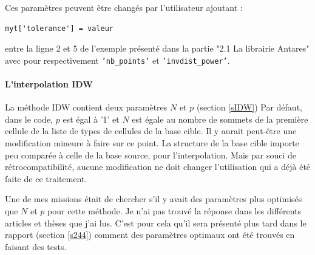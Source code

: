 Ces paramètres peuvent être changés par l'utilisateur ajoutant :
\begin{lstlisting}[]
    myt['tolerance'] = valeur
\end{lstlisting}
entre la ligne 2 et 5 de l'exemple présenté dans la partie "2.1 La librairie Antares" avec pour respectivement \texttt{'nb\_points'} et \texttt{'invdist\_power'}.\label{parametres}

\label{implementation_IDW}\paragraph{L'interpolation IDW}

La méthode IDW contient deux paramètres \(N\) et \(p\) (section \ref{sIDW})
Par défaut, dans le code, \(p\) est égal à '1' et \(N\) est égale au nombre de sommets de la première cellule de la liste de types de cellules de la base cible. Il y aurait peut-être une modification mineure à faire sur ce point. La structure de la base cible importe peu comparée à celle de la base source, pour l'interpolation. Mais par souci de rétrocompatibilité, aucune modification ne doit changer l'utilisation qui a déjà été faite de ce traitement. %


\vspace{0,5cm}

Une de mes missions était de chercher s'il y avait des paramètres plus optimisés que \(N\) et \(p\) pour cette méthode. Je n'ai pas trouvé la réponse dans les différents articles \cite{idw-arcgis} et thèses que j'ai lus. C'est pour cela qu'il sera présenté plus tard dans le rapport (section \ref{s244}) comment des paramètres optimaux ont été trouvés en faisant des tests.

